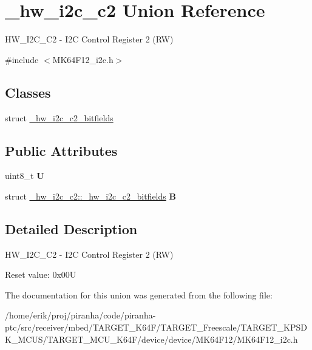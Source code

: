 \hypertarget{union__hw__i2c__c2}{}\section{\+\_\+hw\+\_\+i2c\+\_\+c2 Union Reference}
\label{union__hw__i2c__c2}


H\+W\+\_\+\+I2\+C\+\_\+\+C2 -\/ I2C Control Register 2 (RW)  




{\ttfamily \#include $<$M\+K64\+F12\+\_\+i2c.\+h$>$}

\subsection*{Classes}
\begin{DoxyCompactItemize}
\item 
struct \hyperlink{struct__hw__i2c__c2_1_1__hw__i2c__c2__bitfields}{\+\_\+hw\+\_\+i2c\+\_\+c2\+\_\+bitfields}
\end{DoxyCompactItemize}
\subsection*{Public Attributes}
\begin{DoxyCompactItemize}
\item 
uint8\+\_\+t {\bfseries U}\hypertarget{union__hw__i2c__c2_a077496188d0beafaee12bcd1461612b1}{}\label{union__hw__i2c__c2_a077496188d0beafaee12bcd1461612b1}

\item 
struct \hyperlink{struct__hw__i2c__c2_1_1__hw__i2c__c2__bitfields}{\+\_\+hw\+\_\+i2c\+\_\+c2\+::\+\_\+hw\+\_\+i2c\+\_\+c2\+\_\+bitfields} {\bfseries B}\hypertarget{union__hw__i2c__c2_af4d7962f13f4958a622eaacef45b4a4c}{}\label{union__hw__i2c__c2_af4d7962f13f4958a622eaacef45b4a4c}

\end{DoxyCompactItemize}


\subsection{Detailed Description}
H\+W\+\_\+\+I2\+C\+\_\+\+C2 -\/ I2C Control Register 2 (RW) 

Reset value\+: 0x00U 

The documentation for this union was generated from the following file\+:\begin{DoxyCompactItemize}
\item 
/home/erik/proj/piranha/code/piranha-\/ptc/src/receiver/mbed/\+T\+A\+R\+G\+E\+T\+\_\+\+K64\+F/\+T\+A\+R\+G\+E\+T\+\_\+\+Freescale/\+T\+A\+R\+G\+E\+T\+\_\+\+K\+P\+S\+D\+K\+\_\+\+M\+C\+U\+S/\+T\+A\+R\+G\+E\+T\+\_\+\+M\+C\+U\+\_\+\+K64\+F/device/device/\+M\+K64\+F12/M\+K64\+F12\+\_\+i2c.\+h\end{DoxyCompactItemize}
